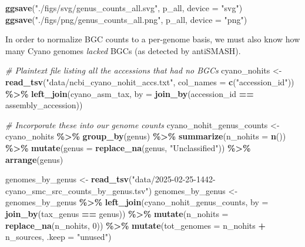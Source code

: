 \documentclass[
]{article}
\newenvironment{Shaded}{\begin{snugshade}}{\end{snugshade}}
\newcommand{\AttributeTok}[1]{\textcolor[rgb]{0.13,0.29,0.53}{#1}}
\newcommand{\CommentTok}[1]{\textcolor[rgb]{0.56,0.35,0.01}{\textit{#1}}}
\newcommand{\DecValTok}[1]{\textcolor[rgb]{0.00,0.00,0.81}{#1}}
\newcommand{\FunctionTok}[1]{\textcolor[rgb]{0.13,0.29,0.53}{\textbf{#1}}}
\newcommand{\NormalTok}[1]{#1}
\newcommand{\OtherTok}[1]{\textcolor[rgb]{0.56,0.35,0.01}{#1}}
\newcommand{\SpecialCharTok}[1]{\textcolor[rgb]{0.81,0.36,0.00}{\textbf{#1}}}
\newcommand{\StringTok}[1]{\textcolor[rgb]{0.31,0.60,0.02}{#1}}
\begin{document}
\begin{Shaded}
\begin{Highlighting}[]
\FunctionTok{ggsave}\NormalTok{(}\StringTok{"./figs/svg/genus\_counts\_all.svg"}\NormalTok{, p\_all, }\AttributeTok{device =} \StringTok{"svg"}\NormalTok{)}
\FunctionTok{ggsave}\NormalTok{(}\StringTok{"./figs/png/genus\_counts\_all.png"}\NormalTok{, p\_all, }\AttributeTok{device =} \StringTok{"png"}\NormalTok{)}
\end{Highlighting}
\end{Shaded}

In order to normalize BGC counts to a per-genome basis, we must also
know how many Cyano genomes \emph{lacked} BGCs (as detected by
antiSMASH).

\begin{Shaded}
\begin{Highlighting}[]
\CommentTok{\# Plaintext file listing all the accessions that had no BGCs}
\NormalTok{cyano\_nohits }\OtherTok{\textless{}{-}} \FunctionTok{read\_tsv}\NormalTok{(}\StringTok{"data/ncbi\_cyano\_nohit\_accs.txt"}\NormalTok{, }\AttributeTok{col\_names =} \FunctionTok{c}\NormalTok{(}\StringTok{"accession\_id"}\NormalTok{)) }\SpecialCharTok{\%\textgreater{}\%}
  \FunctionTok{left\_join}\NormalTok{(cyano\_asm\_tax, }\AttributeTok{by =} \FunctionTok{join\_by}\NormalTok{(accession\_id }\SpecialCharTok{==}\NormalTok{ assembly\_accession))}

\CommentTok{\# Incorporate these into our genome counts}
\NormalTok{cyano\_nohit\_genus\_counts }\OtherTok{\textless{}{-}}\NormalTok{ cyano\_nohits }\SpecialCharTok{\%\textgreater{}\%}
  \FunctionTok{group\_by}\NormalTok{(genus) }\SpecialCharTok{\%\textgreater{}\%}
  \FunctionTok{summarize}\NormalTok{(}\AttributeTok{n\_nohits =} \FunctionTok{n}\NormalTok{()) }\SpecialCharTok{\%\textgreater{}\%}
  \FunctionTok{mutate}\NormalTok{(}\AttributeTok{genus =} \FunctionTok{replace\_na}\NormalTok{(genus, }\StringTok{"Unclassified"}\NormalTok{)) }\SpecialCharTok{\%\textgreater{}\%}
  \FunctionTok{arrange}\NormalTok{(genus)}

\NormalTok{genomes\_by\_genus }\OtherTok{\textless{}{-}} \FunctionTok{read\_tsv}\NormalTok{(}\StringTok{"data/2025{-}02{-}25{-}1442{-}cyano\_smc\_src\_counts\_by\_genus.tsv"}\NormalTok{)}
\NormalTok{genomes\_by\_genus }\OtherTok{\textless{}{-}}\NormalTok{ genomes\_by\_genus }\SpecialCharTok{\%\textgreater{}\%}
  \FunctionTok{left\_join}\NormalTok{(cyano\_nohit\_genus\_counts, }\AttributeTok{by =} \FunctionTok{join\_by}\NormalTok{(tax\_genus }\SpecialCharTok{==}\NormalTok{ genus)) }\SpecialCharTok{\%\textgreater{}\%}
  \FunctionTok{mutate}\NormalTok{(}\AttributeTok{n\_nohits =} \FunctionTok{replace\_na}\NormalTok{(n\_nohits, }\DecValTok{0}\NormalTok{)) }\SpecialCharTok{\%\textgreater{}\%}
  \FunctionTok{mutate}\NormalTok{(}\AttributeTok{tot\_genomes =}\NormalTok{ n\_nohits }\SpecialCharTok{+}\NormalTok{ n\_sources, }\AttributeTok{.keep =} \StringTok{"unused"}\NormalTok{)}
\end{Highlighting}
\end{Shaded}
\end{document}
